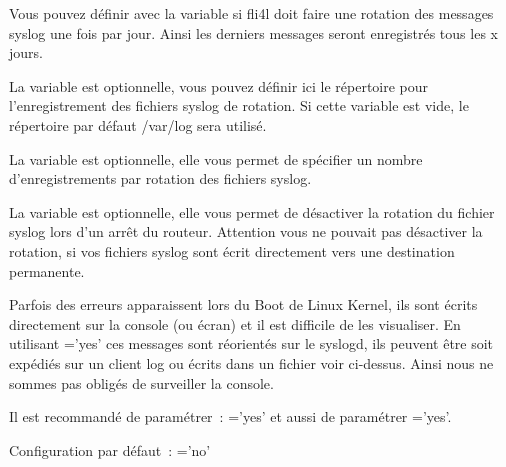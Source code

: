 \begin{description}

  Vous pouvez définir avec la variable  si fli4l doit faire
  une rotation des messages syslog une fois par jour. Ainsi les derniers messages
  seront enregistrés tous les x jours.


  La variable  est optionnelle, vous pouvez définir
  ici le répertoire pour l'enregistrement des fichiers syslog de rotation.
  Si cette variable est vide, le répertoire par défaut /var/log sera utilisé.


  La variable  est optionnelle, elle vous permet de
  spécifier un nombre d'enregistrements par rotation des fichiers syslog.


  La variable  est optionnelle, elle vous
  permet de désactiver la rotation du fichier syslog lors d'un arrêt du routeur.
  Attention vous ne pouvait pas désactiver la rotation, si vos fichiers syslog
  sont écrit directement vers une destination permanente.

\end{description}


  Parfois des erreurs apparaissent lors du Boot de Linux Kernel, ils
  sont écrits directement sur la console (ou écran) et il est difficile
  de les visualiser. En utilisant ='yes' ces messages
  sont réorientés sur le syslogd, ils peuvent être soit expédiés sur un
  client log ou écrits dans un fichier voir ci-dessus. Ainsi nous
  ne sommes pas obligés de surveiller la console.

  \noindent Il est recommandé de paramétrer~: ='yes' et aussi
  de paramétrer ='yes'.

  Configuration par défaut~: ='no'


